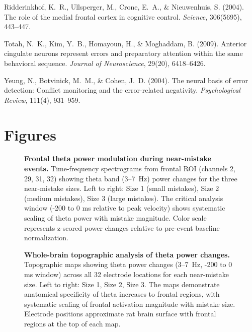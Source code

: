 \documentclass[11pt]{article}
\begin{document}
\begin{thebibliography}{99}
Ridderinkhof, K.~R., Ullsperger, M., Crone, E.~A., \& Nieuwenhuis, S. (2004).
\newblock The role of the medial frontal cortex in cognitive control.
\newblock \emph{Science}, 306(5695), 443--447.


Totah, N.~K., Kim, Y.~B., Homayoun, H., \& Moghaddam, B. (2009).
\newblock Anterior cingulate neurons represent errors and preparatory attention within the same behavioral sequence.
\newblock \emph{Journal of Neuroscience}, 29(20), 6418--6426.


Yeung, N., Botvinick, M.~M., \& Cohen, J.~D. (2004).
\newblock The neural basis of error detection: Conflict monitoring and the error-related negativity.
\newblock \emph{Psychological Review}, 111(4), 931--959.

\end{thebibliography}

\section*{Figures}

\begin{figure}[H]
\centering
\caption{\textbf{Frontal theta power modulation during near-mistake events.} Time-frequency spectrograms from frontal ROI (channels 2, 29, 31, 32) showing theta band (3--7~Hz) power changes for the three near-mistake sizes. Left to right: Size 1 (small mistakes), Size 2 (medium mistakes), Size 3 (large mistakes). The critical analysis window (-200 to 0 ms relative to peak velocity) shows systematic scaling of theta power with mistake magnitude. Color scale represents z-scored power changes relative to pre-event baseline normalization.}
\label{fig:frontal_theta}
\end{figure}

\begin{figure}[H]
\centering
\caption{\textbf{Whole-brain topographic analysis of theta power changes.} Topographic maps showing theta power changes (3--7~Hz, -200 to 0 ms window) across all 32 electrode locations for each near-mistake size. Left to right: Size 1, Size 2, Size 3. The maps demonstrate anatomical specificity of theta increases to frontal regions, with systematic scaling of frontal activation magnitude with mistake size. Electrode positions approximate rat brain surface with frontal regions at the top of each map.}
\label{fig:topography}
\end{figure}
\end{document}

